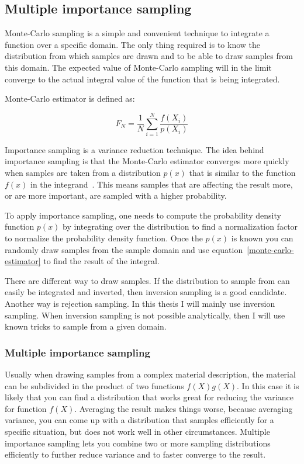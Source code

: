 \documentclass[12pt,a4paper,twoside]{article}
\begin{document}
\subsection{Multiple importance sampling}

Monte-Carlo sampling is a simple and convenient technique to integrate a function over a specific domain. The only thing required is to know the distribution from which samples are drawn and to be able to draw samples from this domain. The expected value of Monte-Carlo sampling will in the limit converge to the actual integral value of the function that is being integrated.

Monte-Carlo estimator is defined as:

\begin{equation}
\label{monte-carlo-estimator}
F_N = \frac{1}{N} \sum_{i=1}^N \frac{f(X_i)}{p(X_i)}
\end{equation}


Importance sampling is a variance reduction technique. The idea behind importance sampling is that the Monte-Carlo estimator converges more quickly when samples are taken from a distribution $p(x)$ that is similar to the function $f(x)$ in the integrand~\cite{pbrtv3}. This means samples that are affecting the result more, or are more important, are sampled with a higher probability.

To apply importance sampling, one needs to compute the probability density function $p(x)$ by integrating over the distribution to find a normalization factor to normalize the probability density function. Once the $p(x)$ is known you can randomly draw samples from the sample domain and use equation~\ref{monte-carlo-estimator} to find the result of the integral. 

There are different way to draw samples. If the distribution to sample from can easily be integrated and inverted, then inversion sampling is a good candidate. Another way is rejection sampling. In this thesis I will mainly use inversion sampling. When inversion sampling is not possible analytically, then I will use known tricks to sample from a given domain.

\subsubsection{Multiple importance sampling}

Usually when drawing samples from a complex material description, the material can be subdivided in the product of two functions $f(X)g(X)$. In this case it is likely that you can find a distribution that works great for reducing the variance for function $f(X)$. Averaging the result makes things worse, because averaging variance, you can come up with a distribution that samples efficiently for a specific situation, but does not work well in other circumstances. Multiple importance sampling lets you combine two or more sampling distributions efficiently to further reduce variance and to faster converge to the result.
\end{document}
